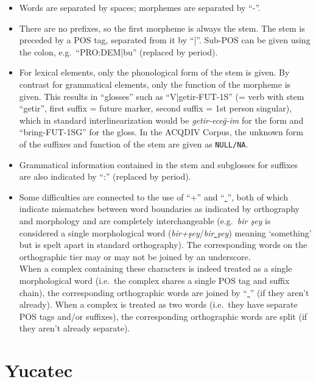 \documentclass[a4paper, 11pt]{book}
\newcommand{\und}{\underline{{ }}\hspace{0.2mm}}	%
\begin{document}
\begin{itemize}
	\item Words are separated by spaces; morphemes are separated by “-”. 
	\item There are no prefixes, so the first morpheme is always the stem. The stem is preceded by a POS tag, separated from it by “|”. 
		Sub-POS can be given using the colon, e.g.\ “PRO:DEM|bu” (replaced by period).
	\item For lexical elements, only the phonological form of the stem is given. By contrast for grammatical elements, only the function of the morpheme is given. 
		This results in “glosses” such as “V|getir-FUT-1S” (= verb with stem “getir”, first suffix = future marker, second suffix = 1st person singular), 
		which in standard interlinearization would be \emph{getir-eceğ-im} for the form and “bring-FUT-1SG” for the gloss. In the ACQDIV Corpus, the unknown
		form of the suffixes and function of the stem are given as \texttt{NULL/NA}.
	\item Grammatical information contained in the stem and subglosses for suffixes are also indicated by “:” (replaced by period). 
	\item Some difficulties are connected to the use of “+” and “\und”, both of which indicate mismatches between word boundaries as indicated by orthography
		and morphology and are completely interchangeable (e.g.\ \emph{bir şey} is considered a single morphological word (\emph{bir+şey}/\emph{bir\und şey})
		meaning ‘something’ but is spelt apart in standard orthography). The corresponding words on the orthographic tier may or may not be joined by
		an underscore. \\
		When a complex containing these characters is indeed treated as a single morphological word (i.e.\ the complex shares a single POS tag and suffix chain), 
		the corresponding orthographic words are joined by “\und” (if they aren’t already). When a complex is treated as two words (i.e.\ they have separate
		POS tags and/or suffixes), the corresponding orthographic words are split (if they aren’t already separate). 	
\end{itemize}


\section{Yucatec}
\label{sec:Yucatec}
\end{document}
